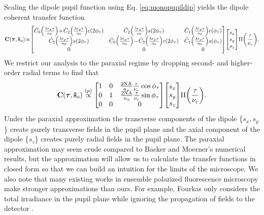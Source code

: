 \documentclass[]{osa-article}
\let\originalleft\left
\let\originalright\right
\renewcommand{\left}{\mathopen{}\mathclose\bgroup\originalleft}
\renewcommand{\right}{\aftergroup\egroup\originalright}
\providecommand{\mb}[1]{\mathbf{#1}}
\providecommand{\so}{\mathbf{\hat{s}}_o}
\providecommand{\bs}[1]{\boldsymbol{#1}}
\providecommand{\taup}{\bs{\tau}}
\begin{document}
 Scaling the dipole pupil function using Eq. \eqref{eq:monopupildip} yields the
 dipole coherent transfer function
 \begin{equation}
   \mb{C}(\taup, \so)\hspace{-0.2em}\propto\hspace{-0.2em}
   \begin{bmatrix}
     \tilde{C}_0\left(\frac{\lambda r_p\tau}{n_0}\right)\!+\!\tilde{C}_2\left(\frac{\lambda r_p\tau}{n_0}\right)c(2\phi_{\tau})&\tilde{C}_2\left(\frac{\lambda r_p\tau}{n_0}\right)s(2\phi_{\tau})&\tilde{C}_1\left(\frac{\lambda r_p\tau}{n_0}\right)c(\phi_{\tau})\\
     \tilde{C}_2\left(\frac{\lambda r_p\tau}{n_0}\right)s(2\phi_{\tau})&\tilde{C}_0\left(\frac{\lambda r_p\tau}{n_0}\right)\!-\!\tilde{C}_2\left(\frac{\lambda r_p\tau}{n_0}\right)c(2\phi_{\tau})&\tilde{C}_1\left(\frac{\lambda r_p\tau}{n_0}\right)s(\phi_{\tau})\\     
     0&0&0\\     
   \end{bmatrix}
   \begin{bmatrix}
     s_x\\
     s_y\\
     s_z
   \end{bmatrix}
   \Pi\left(\frac{\tau}{\nu_c}\right). 
 \end{equation}
 We restrict our analysis to the paraxial regime by dropping second- and
 higher-order radial terms to find that
 \begin{align}
   \mb{C}(\taup, \so) \stackrel{(p)}{\propto}
   \begin{bmatrix}
     1&0&\frac{\text{2NA}}{n_o}\frac{\tau}{\nu_c}\cos\phi_{\tau}\\
     0&1&\frac{\text{2NA}}{n_o}\frac{\tau}{\nu_c}\sin\phi_{\tau}\\
     0&0&0\\     
   \end{bmatrix}
   \begin{bmatrix}
     s_x\\
     s_y\\
     s_z
   \end{bmatrix}
   \Pi\left(\frac{\tau}{\nu_c}\right). \label{eq:coherentdip}
 \end{align}
 Under the paraxial approximation the transverse components of the dipole
 \{$s_x, s_y$\} create purely transverse fields in the pupil plane and the axial
 component of the dipole \{$s_z$\} creates purely radial fields in the pupil
 plane. The paraxial approximation may seem crude compared to Backer and
 Moerner's numerical results, but the approximation will allow us to calculate
 the transfer functions in closed form so that we can build an intuition for the
 limits of the microscope. We also note that many existing works in ensemble
 polarized fluorescence microscopy make stronger approximations than ours. For
 example, Fourkas only considers the total irradiance in the pupil plane while
 ignoring the propagation of fields to the detector \cite{fourkas2001}.
\end{document}
